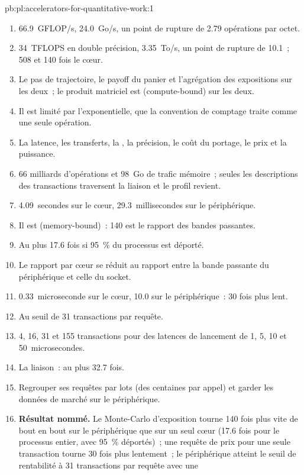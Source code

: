\begin{solution}{pb:pl:accelerators-for-quantitative-work:1}
\begin{enumerate}
\item 66.9~GFLOP/s, 24.0~Go/s, un point de rupture de 2.79 opérations par octet.
\item 34~TFLOPS en double précision, 3.35~To/s, un point de rupture de 10.1~; 508 et 140 fois le cœur.
\item Le pas de trajectoire, le payoff du panier et l'agrégation des expositions sur les deux~; le produit matriciel est  (compute-bound) sur les deux.
\item Il est limité par l'exponentielle, que la convention de comptage traite comme une seule opération.
\item La latence, les transferts, la , la précision, le coût du portage, le prix et la puissance.
\item 66 milliards d'opérations et 98~Go de trafic mémoire~; seules les descriptions des transactions traversent la liaison et le profil revient.
\item 4.09~secondes sur le cœur, 29.3~millisecondes sur le périphérique.
\item Il est  (memory-bound)~: 140 est le rapport des bandes passantes.
\item Au plus 17.6 fois si 95~\% du processus est déporté.
\item Le rapport par cœur se réduit au rapport entre la bande passante du périphérique et celle du socket.
\item 0.33~microseconde sur le cœur, 10.0 sur le périphérique~: 30 fois plus lent.
\item Au seuil de 31 transactions par requête.
\item 4, 16, 31 et 155 transactions pour des latences de lancement de 1, 5, 10 et 50~microsecondes.
\item La liaison~: au plus 32.7 fois.
\item Regrouper ses requêtes par lots (des centaines par appel) et garder les données de marché sur le périphérique.
\item \textbf{Résultat nommé.} Le Monte-Carlo d'exposition tourne 140 fois plus vite de bout en bout sur le périphérique que sur un seul cœur (17.6 fois pour le
processus entier, avec 95~\% déportés)~; une requête de prix pour une seule transaction tourne 30 fois plus lentement~; le périphérique atteint le seuil de rentabilité à 31 transactions par requête avec une

\end{enumerate}
\end{solution}

